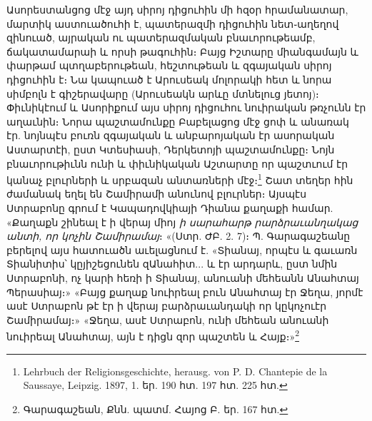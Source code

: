 \documentclass{article}
\begin{document}
{Ասորեստանցոց մէջ այդ սիրոյ դիցուհին մի հզօր հրամանատար, մարտիկ աստուածուհի է, պատերազմի դիցուհին նետ֊աղեղով զինուած, այրական ու պատերազմական բնաւորութեամբ, ճակատամարաի և որսի թագուհին։ Բայց Իշտարը միանգամայն և փարթամ պտղաբերութեան, հեշտութեան և զգայական սիրոյ դիցուհին է։ Նա կապուած է Արուսեակ մոլորակի հետ և նորա սիմբոլն է գիշերավարը (Արուսեակն արևը մտնելուց յետոյ)։ Փիւնիկէում և Ասորիքում այս սիրոյ դիցուհու նուիրական թռչունն էր աղաւնին։ Նորա պաշտամունքը Բաբելացոց մէջ ցոփ և անառակ էր. նոյնպէս բուռն զգայական և անբարոյական էր ասորական Աստարտէի, ըստ Կտեսիասի, Դերկետոյի պաշտամունքը։ Նոյն բնաւորութիւնն ունի և փիւնիկական Աշտարտը որ պաշտւում էր կանաչ բլուրների և սրբազան անտառների մէջ։\footnote{Lehrbuch der Religionsgeschichte, herausg. von P. D. Chantepie de la Saussaye, Leipzig. 1897, 1. եր. 190 հտ. 197 հտ. 225 հտ.} Շատ տեղեր հին ժամանակ եղել են Շամիրամի անունով բլուրներ։ Այսպէս Ստրաբոնը գրում է Կապադովկիայի Դիանա քաղաքի համար. «Քաղաքն շինեալ է ի վերայ միոյ \emph{ի սարահարթ րարձրաւանղակաց անտի, որ կոչին Շամիրամայ}։ «(Ստր. ԺԲ. 2. 7)։ Պ. Գարագաշեանը բերելով այս հատուածն աւելացնում է. «Տիանայ, որպէս և գաւառն Տիանիտիս՝ կըյիշեցունեն զԱնահիտ... և էր արդարև, ըստ նմին Ստրաբոնի, ոչ կարի հեռի ի Տիանայ, անուանի մեհեանն Անահտայ Պերասիայ։» «Բայց քաղաք նուիրեալ բուն Անահտայ էր Ջեղա, յորմէ ասէ Ստրաբոն թէ էր ի վերայ բարձրաւանդակի որ կըկոչուէր Շամիրամայ։» «Ջեղա, ասէ Ստրաբոն, ունի մեհեան անուանի նուիրեալ Անահտայ, այն է դիցն զոր պաշտեն և Հայք։»\footnote{Գարագաշեան, Քնն. պատմ. Հայոց Բ. եր. 167 հտ.}

}
\end{document}
